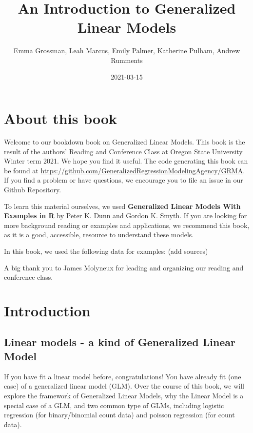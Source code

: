 \documentclass[
]{book}
\title{An Introduction to Generalized Linear Models}
\author{Emma Grossman, Leah Marcus, Emily Palmer, Katherine Pulham, Andrew Rumments}
\date{2021-03-15}
\begin{document}
\maketitle

{
\setcounter{tocdepth}{1}
\tableofcontents
}
\hypertarget{about-this-book}{%
\chapter{About this book}\label{about-this-book}}

Welcome to our bookdown book on Generalized Linear Models. This book is the result of the authors' Reading and Conference Class at Oregon State University Winter term 2021. We hope you find it useful. The code generating this book can be found at \url{https://github.com/GeneralizedRegressionModelingAgency/GRMA}. If you find a problem or have questions, we encourage you to file an issue in our Github Repository.

To learn this material ourselves, we used \textbf{Generalized Linear Models With Examples in R} by Peter K. Dunn and Gordon K. Smyth\citep{dunn2018generalized}. If you are looking for more background reading or examples and applications, we recommend this book, as it is a good, accessible, resource to understand these models.

In this book, we used the following data for examples: (add sources)

A big thank you to James Molyneux for leading and organizing our reading and conference class.

\hypertarget{intro}{%
\chapter{Introduction}\label{intro}}

\hypertarget{linear-models---a-kind-of-generalized-linear-model}{%
\section{Linear models - a kind of Generalized Linear Model}\label{linear-models---a-kind-of-generalized-linear-model}}

If you have fit a linear model before, congratulations! You have already fit (one case) of a generalized linear model (GLM). Over the course of this book, we will explore the framework of Generalized Linear Models, why the Linear Model is a special case of a GLM, and two common type of GLMs, including logistic regression (for binary/binomial count data) and poisson regression (for count data).
\end{document}
